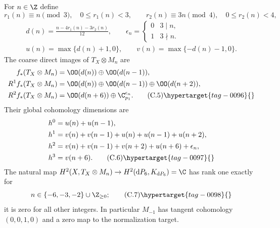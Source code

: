 
\begin{proposition}\hypertarget{tag-01FS}{}\label{cdp:st:C5b}


For $n\in\Z$ define
\[
 r_1(n)\equiv n\pmod3,\quad 0\le r_1(n)<3,
 \qquad r_2(n)\equiv3n\pmod4,\quad0\le r_2(n)<4,
\]
\begin{gather*}
 d(n)=\frac{n-4r_1(n)-3r_2(n)}{12},\qquad
 \epsilon_n=\begin{cases}0&3\mid n,\\1&3\nmid n.\end{cases}
\\
 u(n)=\max\{d(n)+1,0\},\qquad
 v(n)=\max\{-d(n)-1,0\}.
\end{gather*}
The coarse direct images of $T_X\otimes M_n$ are
\begin{align*}
 f_*(T_X\otimes M_n)&=\OO(d(n))\oplus\OO(d(n-1)),\\
 R^1f_*(T_X\otimes M_n)&=\OO(d(n))\oplus\OO(d(n-1))\oplus\OO(d(n+2)),\\
 R^2f_*(T_X\otimes M_n)&=\OO(d(n+6))\oplus\C_{p_1}^{\epsilon_n}.\tag{C.5}\hypertarget{tag-0096}{}\label{cdp:eq:C.5}
\end{align*}
Their global cohomology dimensions are
\begin{align*}
 h^0&=u(n)+u(n-1),\\
 h^1&=v(n)+v(n-1)+u(n)+u(n-1)+u(n+2),\\
 h^2&=v(n)+v(n-1)+v(n+2)+u(n+6)+\epsilon_n,\\
 h^3&=v(n+6).                                             \tag{C.6}\hypertarget{tag-0097}{}\label{cdp:eq:C.6}
\end{align*}
The natural map $H^2(X,T_X\otimes M_n)\to H^2(\mathrm dP_6,K_{\mathrm dP_6})=\C$ has rank one exactly for
\[
 n\in\{-6,-3,-2\}\cup\Z_{\ge0};                         \tag{C.7}\hypertarget{tag-0098}{}\label{cdp:eq:C.7}
\]
it is zero for all other integers. In particular $M_{-1}$ has tangent cohomology $(0,0,1,0)$ and a zero map to the normalization target.
\end{proposition}

